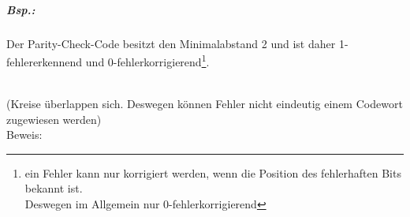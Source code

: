 \documentclass{scrreprt}
\begin{document}
\subparagraph{Bsp.:} Der Parity-Check-Code besitzt den Minimalabstand 2 und ist daher 1-fehlererkennend und 0-fehlerkorrigierend\footnote{ein Fehler kann nur korrigiert werden, wenn die Position des fehlerhaften Bits bekannt ist. \\
Deswegen im Allgemein nur 0-fehlerkorrigierend}.\\
\\
(Kreise überlappen sich. Deswegen können Fehler nicht eindeutig einem Codewort zugewiesen werden)\\
Beweis:
\end{document}
